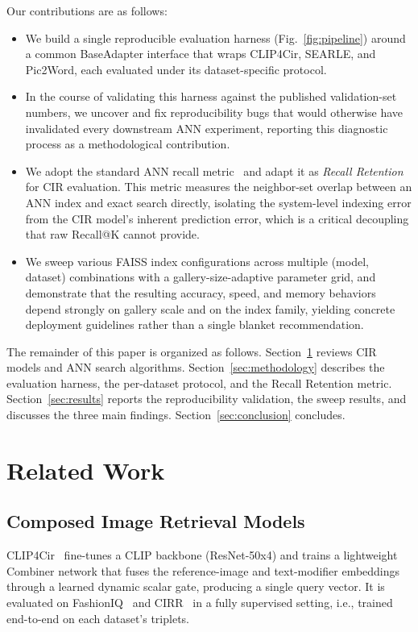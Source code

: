 \documentclass[conference]{IEEEtran}
\begin{document}
Our contributions are as follows:
\begin{itemize}
    \item We build a single reproducible evaluation harness (Fig.~\ref{fig:pipeline}) around a common BaseAdapter interface that wraps CLIP4Cir, SEARLE, and Pic2Word, each evaluated under its dataset-specific protocol.
    \item In the course of validating this harness against the published validation-set numbers, we uncover and fix reproducibility bugs that would otherwise have invalidated every downstream ANN experiment, reporting this diagnostic process as a methodological contribution.
    \item We adopt the standard ANN recall metric~\cite{aumuller2017annbenchmarks} and adapt it as \emph{Recall Retention} for CIR evaluation. This metric measures the neighbor-set overlap between an ANN index and exact search directly, isolating the system-level indexing error from the CIR model's inherent prediction error, which is a critical decoupling that raw Recall@K cannot provide.
    \item We sweep various FAISS index configurations across multiple (model, dataset) combinations with a gallery-size-adaptive parameter grid, and demonstrate that the resulting accuracy, speed, and memory behaviors depend strongly on gallery scale and on the index family, yielding concrete deployment guidelines rather than a single blanket recommendation.
\end{itemize}

The remainder of this paper is organized as follows. Section~\ref{sec:relatedwork} reviews CIR models and ANN search algorithms. Section~\ref{sec:methodology} describes the evaluation harness, the per-dataset protocol, and the Recall Retention metric. Section~\ref{sec:results} reports the reproducibility validation, the sweep results, and discusses the three main findings. Section~\ref{sec:conclusion} concludes.

\section{Related Work}
\label{sec:relatedwork}

\subsection{Composed Image Retrieval Models}
\label{subsec:cir-models}

CLIP4Cir~\cite{baldrati2023composed} fine-tunes a CLIP backbone (ResNet-50x4) and trains a lightweight Combiner network that fuses the reference-image and text-modifier embeddings through a learned dynamic scalar gate, producing a single query vector. It is evaluated on FashionIQ~\cite{wu2021fashion} and CIRR~\cite{liu2021cirr} in a fully supervised setting, i.e., trained end-to-end on each dataset's triplets.
\end{document}
